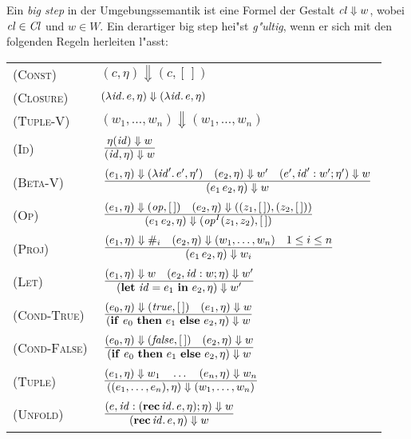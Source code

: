 \documentclass[12pt,fleqn,a4paper]{article}
\newcommand{\RN}[1]{\mbox{\textsc{(#1)}}}
\newcommand{\Cl}{\name{Cl}}
\newcommand{\cl}{\name{cl}}
\begin{document}
\begin{definition}
Ein {\em big step} in der Umgebungssemantik ist eine Formel der Gestalt $\cl \Downarrow w$,
wobei $\cl\in\Cl$ und $w \in W$. Ein derartiger big step hei"st {\em g"ultig}, wenn er sich mit den
folgenden Regeln herleiten l"asst: \\[5mm]
\begin{tabular}{ll}
  \RN{Const}      & $(c,\eta) \Downarrow (c,[\,])$ \\[1mm]
  \RN{Closure}    & $(\lambda {\text{\it id\/}}.\,e,\eta) \Downarrow (\lambda {\text{\it id\/}}.\,e,\eta)$ \\[1mm]
  \RN{Tuple-V}    & $(w_1,\ldots,w_n) \Downarrow (w_1,\ldots,w_n)$ \\[1mm]
  \RN{Id}         & $\regel{\eta(\id) \Downarrow w}
                           {(\id,\eta) \Downarrow w}$ \\[3mm]
  \RN{Beta-V}     & $\regel{(e_1,\eta) \Downarrow (\abstr{\id'}{e'},\eta')
                            \quad (e_2,\eta) \Downarrow w'
                            \quad (e',\id':w';\eta') \Downarrow w}
                           {(\app{e_1}{e_2},\eta) \Downarrow w}$ \\[3mm]
  \RN{Op}         & $\regel{(e_1,\eta) \Downarrow (\op,[\,]) \quad (e_2,\eta) \Downarrow ((z_1,[\,]),(z_2,[\,]))}
                           {(\app{e_1}{e_2},\eta) \Downarrow (\op^I(z_1,z_2),[\,])}$ \\[3mm]
  \RN{Proj}       & $\regel{(e_1,\eta) \Downarrow \proj{i}
                            \quad (e_2,\eta) \Downarrow (w_1,\ldots,w_n)
                            \quad 1 \le i \le n}
                           {(\app{e_1}{e_2},\eta) \Downarrow w_i}$ \\[3mm]
  \RN{Let}        & $\regel{(e_1,\eta) \Downarrow w \quad (e_2,\id:w;\eta) \Downarrow w'}
                           {(\bli{\id}{e_1}{e_2},\eta) \Downarrow w'}$ \\[3mm]
  \RN{Cond-True}  & $\regel{(e_0,\eta) \Downarrow (\true,[\,]) \quad (e_1,\eta) \Downarrow w}
                           {(\bifte{e_0}{e_1}{e_2},\eta) \Downarrow w}$ \\[3mm]
  \RN{Cond-False} & $\regel{(e_0,\eta) \Downarrow (\false,[\,]) \quad (e_2,\eta) \Downarrow w}
                           {(\bifte{e_0}{e_1}{e_2},\eta) \Downarrow w}$ \\[3mm]
  \RN{Tuple}      & $\regel{(e_1,\eta) \Downarrow w_1 \quad \ldots \quad (e_n,\eta) \Downarrow w_n}
                           {((e_1,\ldots,e_n),\eta) \Downarrow (w_1,\ldots,w_n)}$ \\[3mm]
  \RN{Unfold}     & $\regel{(e,\id:(\rec{\id}{e},\eta);\eta) \Downarrow w}
                           {(\rec{\id}{e},\eta) \Downarrow w}$ \\[3mm]
\end{tabular}
\end{definition}
\end{document}
